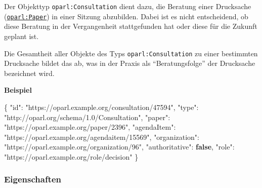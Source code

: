 \documentclass[,a4paper]{article}
\newenvironment{Shaded}{}{}
\newcommand{\KeywordTok}[1]{\textcolor[rgb]{0.00,0.44,0.13}{\textbf{{#1}}}}
\newcommand{\DataTypeTok}[1]{\textcolor[rgb]{0.56,0.13,0.00}{{#1}}}
\newcommand{\StringTok}[1]{\textcolor[rgb]{0.25,0.44,0.63}{{#1}}}
\newcommand{\FunctionTok}[1]{\textcolor[rgb]{0.02,0.16,0.49}{{#1}}}
\begin{document}

Der Objekttyp \texttt{oparl:Consultation} dient dazu, die Beratung einer
Drucksache (\hyperref[oparlux5fpaper]{\texttt{oparl:Paper}}) in einer
Sitzung abzubilden. Dabei ist es nicht entscheidend, ob diese Beratung
in der Vergangenheit stattgefunden hat oder diese für die Zukunft
geplant ist.

Die Gesamtheit aller Objekte des Typs \texttt{oparl:Consultation} zu
einer bestimmten Drucksache bildet das ab, was in der Praxis als
``Beratungsfolge'' der Drucksache bezeichnet wird.

\textbf{Beispiel}

\begin{Shaded}
\begin{Highlighting}[]
\FunctionTok{\{}
    \DataTypeTok{"id"}\FunctionTok{:} \StringTok{"https://oparl.example.org/consultation/47594"}\FunctionTok{,}
    \DataTypeTok{"type"}\FunctionTok{:} \StringTok{"http://oparl.org/schema/1.0/Consultation"}\FunctionTok{,}
    \DataTypeTok{"paper"}\FunctionTok{:} \StringTok{"https://oparl.example.org/paper/2396"}\FunctionTok{,}
    \DataTypeTok{"agendaItem"}\FunctionTok{:} \StringTok{"https://oparl.example.org/agendaitem/15569"}\FunctionTok{,}
    \DataTypeTok{"organization"}\FunctionTok{:} \StringTok{"https://oparl.example.org/organization/96"}\FunctionTok{,}
    \DataTypeTok{"authoritative"}\FunctionTok{:} \KeywordTok{false}\FunctionTok{,}
    \DataTypeTok{"role"}\FunctionTok{:} \StringTok{"https://oparl.example.org/role/decision"}
\FunctionTok{\}}
\end{Highlighting}
\end{Shaded}

\subsubsection{Eigenschaften}\label{eigenschaften-8}
\end{document}
